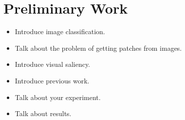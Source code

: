 \documentclass[English]{style/ic-tese-v3}
\begin{document}
\section{Preliminary Work}
\begin{itemize}
    \item Introduce image classification.
    \item Talk about the problem of getting patches from images.
    \item Introduce visual saliency.
    \item Introduce previous work.
    \item Talk about your experiment.
    \item Talk about results.
\end{itemize}

\renewcommand\bibname{References\vspace*{10mm}}

\begingroup
\let\clearpage\relax


\endgroup
\end{document}
